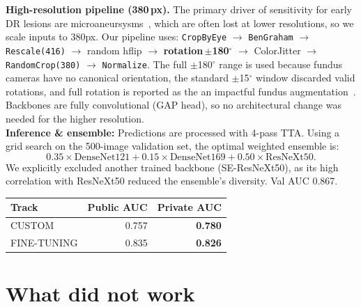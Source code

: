 \documentclass[a4paper, 10pt, twocolumn]{article}
\begin{document}
\textbf{High-resolution pipeline (380\,px).} The primary driver of sensitivity for early DR
lesions are microaneursysms~\cite{abramoff2018pivotal}, which are often lost at lower resolutions, so we scale inputs to 380px. Our pipeline uses: \texttt{CropByEye} $\to$
\texttt{BenGraham} $\to$ \texttt{Rescale(416)} $\to$ random hflip $\to$
\textbf{rotation\,$\pm$180$^\circ$} $\to$ ColorJitter $\to$
\texttt{RandomCrop(380)} $\to$ \texttt{Normalize}. The full $\pm$180$^\circ$
range is used because fundus cameras have no canonical orientation, the
standard $\pm$15$^\circ$ window discarded valid rotations,
and full rotation is reported as the an impactful fundus
augmentation~\cite{graham2015kaggle}. Backbones are fully convolutional
(GAP head), so no architectural change was needed for the higher resolution.\\
\textbf{Inference \& ensemble:} Predictions are processed with 4-pass TTA. Using a grid search on the 500-image validation set, the optimal weighted ensemble is:$$0.35 \times \text{DenseNet121} + 0.15 \times \text{DenseNet169} + 0.50 \times \text{ResNeXt50}.$$
We explicitly excluded another trained backbone (SE-ResNeXt50), as its high correlation with ResNeXt50 reduced the ensemble's diversity. Val AUC 0.867. 

\begin{table}[htbp]
    \centering
    \label{tab:final_results}
    \begin{tabular}{lrr}
        \toprule
        \textbf{Track} & \textbf{Public AUC} & \textbf{Private AUC} \\
        \midrule
        CUSTOM & 0.757 &\textbf{ 0.780} \\
        FINE-TUNING    & 0.835 & \textbf{0.826} \\
        \bottomrule
    \end{tabular}
\end{table}

\section{What did not work}
\end{document}
